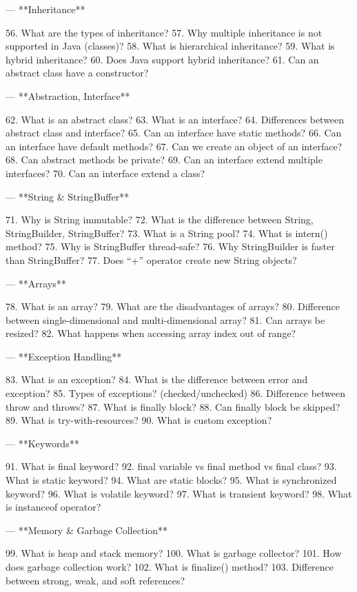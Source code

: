 ---
 **Inheritance**

56. What are the types of inheritance?
57. Why multiple inheritance is not supported in Java (classes)?
58. What is hierarchical inheritance?
59. What is hybrid inheritance?
60. Does Java support hybrid inheritance?
61. Can an abstract class have a constructor?

---
 **Abstraction, Interface**

62. What is an abstract class?
63. What is an interface?
64. Differences between abstract class and interface?
65. Can an interface have static methods?
66. Can an interface have default methods?
67. Can we create an object of an interface?
68. Can abstract methods be private?
69. Can an interface extend multiple interfaces?
70. Can an interface extend a class?

---
 **String & StringBuffer**

71. Why is String immutable?
72. What is the difference between String, StringBuilder, StringBuffer?
73. What is a String pool?
74. What is intern() method?
75. Why is StringBuffer thread-safe?
76. Why StringBuilder is faster than StringBuffer?
77. Does “+” operator create new String objects?

---
 **Arrays**

78. What is an array?
79. What are the disadvantages of arrays?
80. Difference between single-dimensional and multi-dimensional array?
81. Can arrays be resized?
82. What happens when accessing array index out of range?

---
 **Exception Handling**

83. What is an exception?
84. What is the difference between error and exception?
85. Types of exceptions? (checked/unchecked)
86. Difference between throw and throws?
87. What is finally block?
88. Can finally block be skipped?
89. What is try-with-resources?
90. What is custom exception?

---
 **Keywords**

91. What is final keyword?
92. final variable vs final method vs final class?
93. What is static keyword?
94. What are static blocks?
95. What is synchronized keyword?
96. What is volatile keyword?
97. What is transient keyword?
98. What is instanceof operator?

---
 **Memory & Garbage Collection**

99. What is heap and stack memory?
100. What is garbage collector?
101. How does garbage collection work?
102. What is finalize() method?
103. Difference between strong, weak, and soft references?

